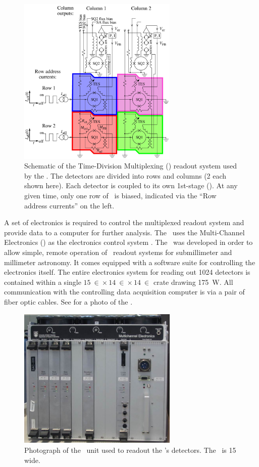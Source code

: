 \begin{figure}
\centering
\includegraphics[width=3in]{images/ch4-tdm-schematic.png}
\caption[Time-Division Multiplexing Schematic]{
  Schematic of the Time-Division Multiplexing (\TDM) readout system used by the \Imager.
  The detectors are divided into rows and columns (2 each shown here).
  Each detector is coupled to its own 1st-stage \SQUID ().
  At any given time, only one row of \SQUIDs\ is biased, indicated via the ``Row address currents'' on the left.
}
\label{fig:ch4-tdm-schematic}
\end{figure}

A set of electronics is required to control the multiplexed readout system and provide data to a computer for further analysis.
The \Imager\ uses the Multi-Channel Electronics (\MCE) as the electronics control system \cite{battistelli_functional_2008,battistelli_automated_2008,_mcewiki_2014}.
The \MCE\ was developed in order to allow simple, remote operation of \TDM\ readout systems for submillimeter and millimeter astronomy.
It comes equipped with a software suite for controlling the electronics itself.
The entire electronics system for reading out 1024 detectors is contained within a single $\SI{15}{\in} \times \SI{14}{\in} \times \SI{14}{\in}$ crate drawing \SI{175}{\W}.
All communication with the controlling data acquisition computer is via a pair of fiber optic cables.
See  for a photo of the \MCE.

\begin{figure}
\centering
\includegraphics[width=3in]{images/ch4-mce.jpg}
\caption[Photograph of the \MCE]{
  Photograph of the \MCE\ unit used to readout the \Imager's detectors.
  The \MCE\ is \SI{15}{\in} wide.
}
\label{fig:ch4-mce-photo}
\end{figure}


